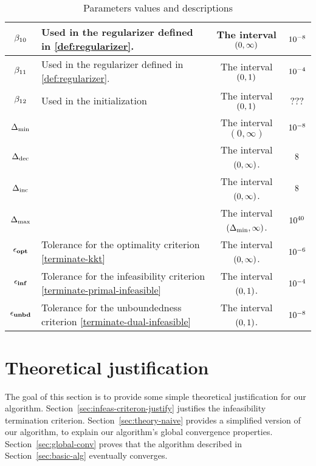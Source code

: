 \documentclass{article}
\begin{document}
\begin{table}[H]
\begin{tabular}{ |c| p{7cm}|c|c| }
\hline
$\beta_{10}$ & Used in the regularizer defined in \eqref{def:regularizer}. & The interval $(0,\infty)$ & $10^{-8}$ \\
\hline
$\beta_{11}$ & Used in the regularizer defined in \eqref{def:regularizer}. & The interval $(0,1)$ & $10^{-4}$ \\
\hline
$\beta_{12}$  & Used in the initialization & The interval $(0,1)$ & ??? \\
\hline
$\Delta_{\min}$ &  & The interval $(0,\infty)$ & $10^{-8}$ \\
\hline
$\Delta_{\text{dec}}$ & &The interval $(0,\infty)$. & $8$ \\
\hline
$\Delta_{\text{inc}}$ & &The interval $(0,\infty)$. & $8$ \\
\hline
$\Delta_{\max}$ & &The interval $(\Delta_{\min},\infty)$. & $10^{40}$ \\
\hline
$\epsilon_{\textbf{opt}}$ & Tolerance for the optimality criterion \eqref{terminate-kkt} & The interval $(0,\infty)$. & $10^{-6}$  \\
\hline
$\epsilon_{\textbf{inf}}$ & Tolerance for the infeasibility criterion \eqref{terminate-primal-infeasible} & The interval $(0,1)$. & $10^{-4}$ \\
\hline
$\epsilon_{\textbf{unbd}}$ & Tolerance for the unboundedness criterion \eqref{terminate-dual-infeasible} & The interval $(0,1)$. & $10^{-8}$ \\
\hline
\end{tabular}
\caption{Parameters values and descriptions}
\end{table}


\section{Theoretical justification}\label{sec:theory}

The goal of this section is to provide some simple theoretical justification for our algorithm. Section~\ref{sec:infeas-criteron-justify} justifies the infeasibility termination criterion. Section~\ref{sec:theory-naive} provides a simplified version of our algorithm, to explain our algorithm's global convergence properties. Section~\ref{sec:global-conv} proves that the algorithm described in Section~\ref{sec:basic-alg} eventually converges. 
\end{document}
